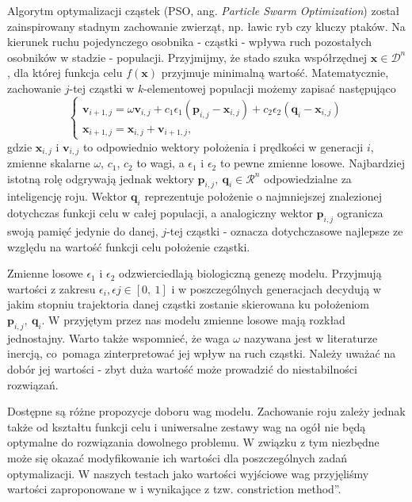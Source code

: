 \documentclass[11pt, a4paper, oneside]{article}
\newcommand{\vect}[1]{\bm{\mathbf{#1}}}
\begin{document}
Algorytm optymalizacji cząstek (PSO, ang. {\it Particle Swarm Optimization}) został zainspirowany stadnym zachowanie zwierząt, np. ławic ryb czy kluczy ptaków. Na kierunek ruchu pojedynczego osobnika - cząstki - wpływa ruch pozostałych osobników w stadzie - populacji. Przyjmijmy, że stado szuka współrzędnej $\vect{x} \in \mathcal{D}^{n}$, dla której funkcja celu $f\left(\vect{x}\right)$ przyjmuje minimalną wartość. Matematycznie, zachowanie $j$-tej cząstki w $k$-elementowej populacji możemy zapisać następująco
\begin{equation}
\begin{cases}
\vect{v}_{i + 1, j} = \omega \vect{v}_{i, j} + c_{1} \epsilon_{1} \left(\vect{p}_{i, j} - \vect{x}_{i, j}\right) + c_{2} \epsilon_{2} \left(\vect{q}_{i} - \vect{x}_{i, j}\right) \\
\vect{x}_{i + 1, j} = \vect{x}_{i, j} + \vect{v}_{i + 1, j},
\end{cases}
\end{equation}
gdzie $\vect{x}_{i, j}$ i $\vect{v}_{i, j}$ to odpowiednio wektory położenia i prędkości w generacji $i$, zmienne skalarne $\omega$, $c_1$, $c_2$ to wagi, a $\epsilon_{1}$ i  $\epsilon_{2}$ to pewne zmienne losowe. Najbardziej istotną rolę odgrywają jednak wektory $\vect{p}_{i, j}, \ \vect{q}_{i} \in \mathcal{R}^{n}$ odpowiedzialne za inteligencję roju. Wektor $\vect{q}_{i}$ reprezentuje położenie o najmniejszej znalezionej dotychczas funkcji celu w całej populacji, a analogiczny wektor $\vect{p}_{i, j}$ ogranicza swoją pamięć jedynie do danej, $j$-tej cząstki - oznacza dotychczasowe najlepsze ze względu na wartość funkcji celu położenie cząstki.

Zmienne losowe $\epsilon_{1}$ i $\epsilon_{2}$ odzwierciedlają biologiczną genezę modelu. Przyjmują wartości z zakresu $\epsilon_{i}, \epsilon{j} \in \left[0, \ 1\right]$ i w poszczególnych generacjach decydują w jakim stopniu trajektoria danej cząstki zostanie skierowana ku położeniom $\vect{p}_{i, j}, \ \vect{q}_{i}$. W przyjętym przez nas modelu zmienne losowe mają rozkład jednostajny. Warto także wspomnieć, że waga $\omega$ nazywana jest w literaturze \cite{BrattonKennedy} inercją, co~pomaga zinterpretować jej wpływ na ruch cząstki. Należy uważać na dobór jej wartości - zbyt duża wartość może prowadzić do niestabilności rozwiązań.

Dostępne są różne propozycje doboru wag modelu. Zachowanie roju zależy jednak także od kształtu funkcji celu i uniwersalne zestawy wag na ogół nie będą optymalne do rozwiązania dowolnego problemu. W związku z tym niezbędne może się okazać modyfikowanie ich wartości dla poszczególnych zadań optymalizacji. W naszych testach jako wartości wyjściowe wag przyjęliśmy wartości zaproponowane w \cite{BrattonKennedy} i wynikające z tzw. \quotedblbase constriction method\textquotedblright.
\end{document}
